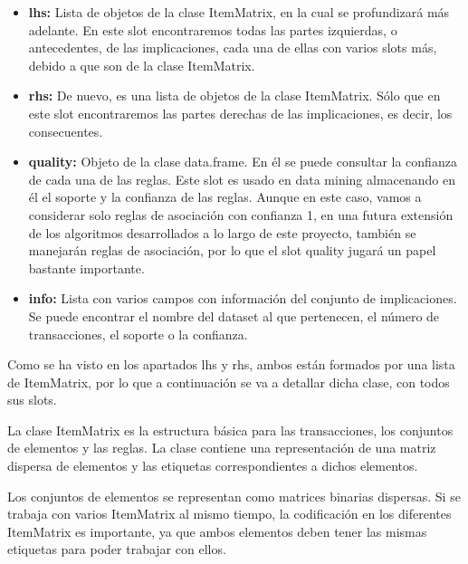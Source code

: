 \begin{itemize}
    \item \textbf{lhs:}
    Lista de objetos de la clase ItemMatrix, en la cual se profundizar\'a m\'as 
    adelante. En este slot encontraremos todas las partes izquierdas, o antecedentes, de las 
    implicaciones, cada una de ellas con varios slots m\'as, debido a que son de la 
    clase ItemMatrix. 

    \item \textbf{rhs:}
    De nuevo, es una lista de objetos de la clase ItemMatrix. S\'olo que en este 
    slot encontraremos las partes derechas de las implicaciones, es decir, los consecuentes.

    \item \textbf{quality:}
    Objeto de la clase data.frame. En \'el se puede consultar la confianza de cada 
    una de las reglas. Este slot es usado en data mining almacenando en \'el el 
    soporte y la confianza de las reglas. Aunque en este caso, vamos a considerar 
    solo reglas de asociaci\'on con confianza 1, en una futura extensi\'on de los 
    algoritmos desarrollados a lo largo de este proyecto, tambi\'en se manejar\'an reglas de 
    asociaci\'on, por lo que el slot quality jugar\'a un papel bastante importante.

    \item \textbf{info:}
    Lista con varios campos con informaci\'on del conjunto de implicaciones. Se puede 
    encontrar el nombre del dataset al que pertenecen, el n\'umero de transacciones, 
    el soporte o la confianza.

\end{itemize}


Como se ha visto en los apartados lhs y rhs, ambos est\'an formados por una lista de 
ItemMatrix, por lo que a continuaci\'on se va a detallar dicha clase, con todos sus slots.

La clase ItemMatrix es la estructura b\'asica para las transacciones, los 
conjuntos de elementos y las reglas.
La clase contiene una representaci\'on de una matriz dispersa de elementos 
y las etiquetas correspondientes a dichos elementos.

Los conjuntos de elementos se representan como matrices binarias dispersas. 
Si se trabaja con varios ItemMatrix al mismo tiempo, la codificaci\'on 
en los diferentes ItemMatrix es importante, ya que ambos elementos deben tener 
las mismas etiquetas para poder trabajar con ellos.

